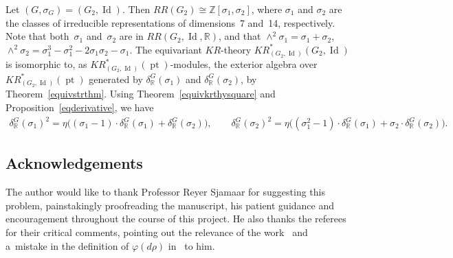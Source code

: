 \documentclass[pdftex]{sigma}
\numberwithin{equation}{section}
\DeclareMathOperator{\pt}{pt}
\DeclareMathOperator{\Id}{Id}
\begin{document}
\begin{Example}
Let $(G,\sigma_G)=(G_2,\Id)$.
Then $RR(G_2)\cong\mathbb{Z}[\sigma_1, \sigma_2]$, where $\sigma_1$ and $\sigma_2$
are the classes of irreducible representations of dimensions~7 and~14, respectively.
Note that both~$\sigma_1$ and~$\sigma_2$ are in $RR(G_2,\Id, \mathbb{R})$, and that $\wedge^2
\sigma_1=\sigma_1+\sigma_2$, $\wedge^2\sigma_2=\sigma_1^3-\sigma_1^2-2\sigma_1\sigma_2-\sigma_1$.
The equivariant $KR$-theory $KR^*_{(G_2,\Id
)}(G_2,\Id)$ is isomorphic to, as $KR^*_{(G_2,\Id)}(\pt)$-modules, the exterior algebra over
$KR^*_{(G_2,\Id)}(\pt)$ generated by $\delta_\mathbb{R}^G(\sigma_1)$ and $\delta_\mathbb{R}^G(\sigma_2)$,
by Theorem~\ref{equivstrthm}.
Using Theorem~\ref{equivkrthysquare} and Proposition~\ref{eqderivative}, we have
\begin{gather*}
\delta_\mathbb{R}^G(\sigma_1)^2=\eta\big((\sigma_1-1)\cdot\delta_\mathbb{R}^G(\sigma_1)+\delta_\mathbb{R}^G(\sigma_2)\big),
\qquad
\delta_\mathbb{R}^G(\sigma_2)^2
=\eta\big((\sigma_1^2-1)\cdot\delta_\mathbb{R}^G(\sigma_1)+\sigma_2\cdot\delta_\mathbb{R}^G(\sigma_2)\big).
\end{gather*}
\end{Example}



\subsection*{Acknowledgements}

The author would like to thank Professor Reyer Sjamaar for suggesting this problem, pains\-takingly proofreading the
manuscript, his patient guidance and encouragement throughout the course of this project.
He also thanks the referees for their critical comments, pointing out the relevance of the work~\cite{Bo} and a~mistake
in the def\/inition of $\varphi(d\rho)$ in~\cite{BZ} to him.
\end{document}
